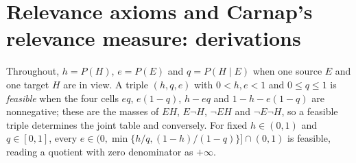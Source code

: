 \section{Relevance axioms and Carnap's relevance measure: derivations}
\label{sec:p15-w02b-p15-024-annex}

Throughout, \(h=P(H)\), \(e=P(E)\) and \(q=P(H\mid E)\) when one
source \(E\) and one target \(H\) are in view. A triple \((h,q,e)\) with
\(0<h,e<1\) and \(0\leq q\leq1\) is \emph{feasible} when the four cells
\(eq\), \(e(1-q)\), \(h-eq\) and \(1-h-e(1-q)\) are nonnegative; these
are the masses of \(EH\), \(E\neg H\), \(\neg EH\) and \(\neg E\neg H\),
so a feasible triple determines the joint table and conversely. For
fixed \(h\in(0,1)\) and \(q\in[0,1]\), every
\(e\in(0,\min\{h/q,(1-h)/(1-q)\}]\cap(0,1)\) is feasible, reading a
quotient with zero denominator as \(+\infty\).


